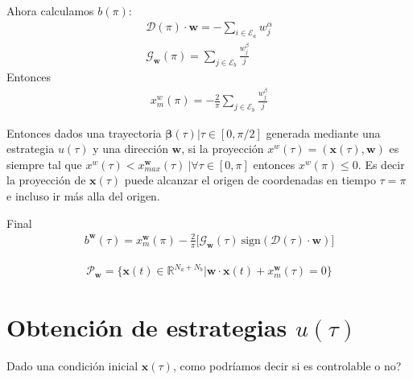Ahora calculamos $b(\pi)$: 
\begin{gather}
    \bm{\mathcal{D}}(\pi) \cdot \bm{w} = 
    - \sum_{i \in \mathcal{E}_a} w_j^\alpha   \\
    \mathcal{G}_{\bm{w}}(\pi) = \sum_{j \in \mathcal{E}_b} \frac{w_j^\beta}{j}
\end{gather}
Entonces 
\begin{gather}
    x_{m}^w(\pi) = - \frac{2}{\pi} \sum_{j \in \mathcal{E}_b} \frac{w_j^\beta}{j}
\end{gather}
\begin{theorem}
Entonces dados una trayectoria $\bm{\beta}(\tau)  |  \tau \in [0,\pi/2]$ generada mediante una estrategia $u(\tau)$ y una dirección $\bm{w}$, si la proyección  $x^w(\tau) = (\bm{x}(\tau),\bm{w})$ es siempre tal que $ x^w(\tau) < x^{\bm{w}}_{max }(\tau) \ |  \forall \tau \in [0,\pi]$ entonces $x^w(\pi)\leq 0$. Es decir la proyección de $\bm{x}(\tau)$ puede alcanzar el origen de coordenadas en tiempo $\tau = \pi$ e incluso ir más alla del origen.
\end{theorem}

Final 
\begin{gather}
   b^{\bm{w}}(\tau) =  
    x^{\bm{w}}_m(\pi)- \frac{2}{\pi} 
    \Big[ 
    \mathcal{G}_{\bm{w}}(\tau) \ \text{sign}(\bm{\mathcal{D}}(\tau) \cdot \bm{w})
    \Big]
\end{gather}


\begin{gather}
    \mathcal{P}_{\bm{w}} =
    \{ \bm{x}(t) \in \mathbb{R}^{N_a + N_b}|
     \bm{w} \cdot \bm{x}(t) + x^{\bm{w}}_m(\tau) = 0\}
\end{gather}
\section{Obtención de estrategias $u(\tau)$}

Dado una condición inicial $\bm{x}(\tau)$, como podríamos decir si es controlable  o no?    
